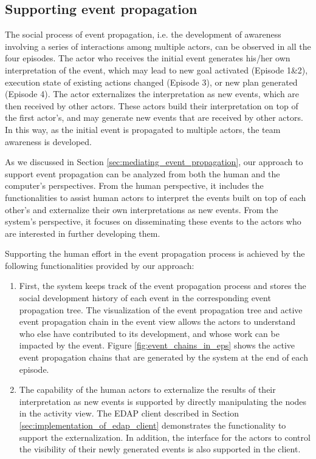 \subsection{Supporting event propagation} %
\label{sub:supporting_event_propagation}
The social process of event propagation, i.e. the development of awareness involving a series of interactions among multiple actors, can be observed in all the four episodes. The actor who receives the initial event generates his/her own interpretation of the event, which may lead to new goal activated (Episode 1\&2), execution state of existing actions changed (Episode 3), or new plan generated (Episode 4). The actor externalizes the interpretation as new events, which are then received by other actors. These actors build their interpretation on top of the first actor's, and may generate new events that are received by other actors. In this way, as the initial event is propagated to multiple actors, the team awareness is developed.

As we discussed in Section \ref{sec:mediating_event_propagation}, our approach to support event propagation can be analyzed from both the human and the computer's perspectives. From the human perspective, it includes the functionalities to assist human actors to interpret the events built on top of each other's and externalize their own interpretations as new events. From the system's perspective, it focuses on disseminating these events to the actors who are interested in further developing them.

Supporting the human effort in the event propagation process is achieved by the following functionalities provided by our approach:

\begin{enumerate}
	\item First, the system keeps track of the event propagation process and stores the social development history of each event in the corresponding event propagation tree. The visualization of the event propagation tree and active event propagation chain in the event view allows the actors to understand who else have contributed to its development, and whose work can be impacted by the event. Figure \ref{fig:event_chains_in_eps} shows the active event propagation chains that are generated by the system at the end of each episode.
	\item The capability of the human actors to externalize the results of their interpretation as new events is supported by directly manipulating the nodes in the activity view. The EDAP client described in Section \ref{sec:implementation_of_edap_client} demonstrates the functionality to support the externalization. In addition, the interface for the actors to control the visibility of their newly generated events is also supported in the client.
\end{enumerate}

